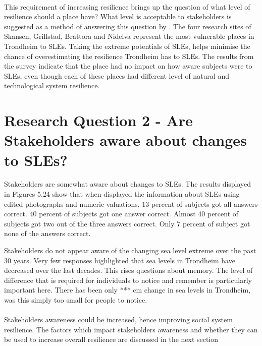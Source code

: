\paragraph{}
This requirement of increasing resilience brings up the question of what level of resilience should a place have? What level is acceptable to stakeholders is suggested as a method of answering this question by \cite{gerkensmeier_governing_2018}. The four research sites of Skansen, Grillstad, Brattora and Nidelva represent the most vulnerable places in Trondheim to SLEs. Taking the extreme potentials of SLEs, helps minimise the chance of overestimating the resilience Trondheim has to SLEs. The results from the survey indicate that the place had no impact on how aware subjects were to SLEs, even though each of these places had different level of natural and technological system resilience. 




\section{Research Question 2 - Are Stakeholders aware about changes to SLEs?}
Stakeholders are somewhat aware about changes to SLEs. The results displayed in Figures 5.24
show that when displayed the information about SLEs using edited photographs and numeric valuations, 13 percent of subjects got all answers correct. 40 percent of subjects got one answer correct. Almost 40 percent of subjects got two out of the three answers correct. Only 7 percent of subject got none of the answers correct. 

 Stakeholders do not appear aware of the changing sea level extreme over the past 30 years. Very few responses highlighted that sea levels in Trondheim have decreased over the last decades. This rises questions about memory. The level of difference that is required for individuals to notice and remember is particularly important here. There has been only *** cm change in sea levels in Trondheim, was this simply too small for people to notice. 

\paragraph{}

\paragraph{}
Stakeholders awareness could be increased, hence improving social system resilience. The factors which impact stakeholders awareness and whether they can be used to increase overall resilience are discussed in the next section 

